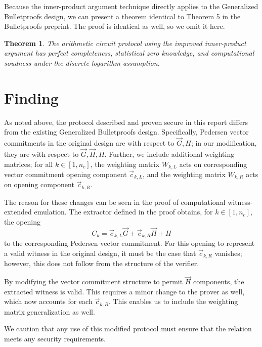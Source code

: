 \documentclass{article}
\newtheorem*{theorem}{Theorem}
\begin{document}
Because the inner-product argument technique directly applies to the Generalized Bulletproofs design, we can present a theorem identical to Theorem 5 in the Bulletproofs preprint.
The proof is identical as well, so we omit it here.

\begin{theorem}
	The arithmetic circuit protocol using the improved inner-product argument has perfect completeness, statistical zero knowledge, and computational soudness under the discrete logarithm assumption.
\end{theorem}


\section{Finding}

As noted above, the protocol described and proven secure in this report differs from the existing Generalized Bulletproofs design.
Specifically, Pedersen vector commitments in the original design are with respect to $\vec{G}, H$; in our modification, they are with respect to $\vec{G}, \vec{H}, H$.
Further, we include additional weighting matrices; for all $k \in [1, n_c]$, the weighting matrix $W_{k,L}$ acts on corresponding vector commitment opening component $\vec{c}_{k,L}$, and the weighting matrix $W_{k,R}$ acts on opening component $\vec{c}_{k,R}$.

The reason for these changes can be seen in the proof of computational witness-extended emulation.
The extractor defined in the proof obtains, for $k \in [1, n_c]$, the opening
$$C_k = \vec{c}_{k,L} \vec{G} + \vec{c}_{k,R} \vec{H} + H$$
to the corresponding Pedersen vector commitment.
For this opening to represent a valid witness in the original design, it must be the case that $\vec{c}_{k,R}$ vanishes; however, this does not follow from the structure of the verifier.

By modifying the vector commitment structure to permit $\vec{H}$ components, the extracted witness is valid.
This requires a minor change to the prover as well, which now accounts for each $\vec{c}_{k,R}$.
This enables us to include the weighting matrix generalization as well.

We caution that any use of this modified protocol must ensure that the relation meets any security requirements.




\end{document}

